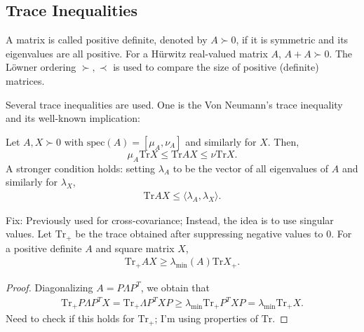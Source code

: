 \subsection{Trace Inequalities}
A matrix is called positive definite, denoted by $A \succ 0$, if it is symmetric and its eigenvalues are all positive. 
For a H\"{u}rwitz real-valued matrix $A$, $A + A \succ 0$.
The L\"{o}wner ordering $\succ, \prec$ is used to compare the size of positive (definite) matrices. 




Several trace inequalities are used. 
One is the Von Neumann's trace inequality and its well-known implication:
\begin{proposition}\label{prop:trace}
    Let $A, X \succ 0$ with $\mathrm{spec}(A) = [\mu_A, \nu_A]$ and similarly for $X$.
    Then,
    \begin{equation}
        \mu_A \mathrm{Tr}X \leq \mathrm{Tr} AX \leq \nu \mathrm{Tr} X .
    \end{equation}
    A stronger condition holds: setting $\lambda_A$ to be the vector of all eigenvalues of $A$ and similarly for $\lambda_X$,
    \begin{align*}
        \mathrm{Tr} A X \leq \langle \lambda_A, \lambda_X \rangle .
    \end{align*}
\end{proposition}



\begin{proposition}\label{prop:joint_trace}
    {\color{red}Fix: Previously used for cross-covariance; Instead, the idea is to use singular values.}
    Let $\mathrm{Tr}_+$ be the trace obtained after suppressing negative values to 0.
    For a positive definite $A$ and square matrix $X$, 
    \begin{align*}
        \mathrm{Tr}_+ A X \geq \lambda_{\min} (A) \mathrm{Tr} X_+ .
    \end{align*}    
\end{proposition}
\begin{proof}
    Diagonalizing $A = P \Lambda P^T$, we obtain that 
    \begin{align*}
        \mathrm{Tr}_+ P \Lambda P^T X = \mathrm{Tr}_+ \Lambda P^T X P 
        \geq \lambda_{\min} \mathrm{Tr}_+ P^T X P
        = \lambda_{\min} \mathrm{Tr}_+ X .
    \end{align*}
    {\color{red}Need to check if this holds for $\mathrm{Tr}_+$; I'm using properties of $\mathrm{Tr}$.}
\end{proof}